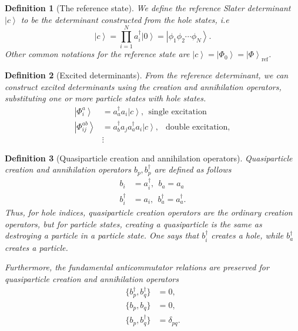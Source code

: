 \documentclass[a4paper,10pt]{article}
\newcommand{\ket}[1]{\left| #1 \right\rangle} \newcommand{\element}[3]
\theoremstyle{definition}
\newtheorem{definition}{Definition}
\begin{document}
\begin{definition}[The reference state]
 We define the reference Slater determinant $\ket{c}$ to be the determinant constructed from the hole states, i.e 
 \begin{equation}
  \ket{c} = \prod_{i=1}^N a_i^\dagger \ket{0} = \ket{\phi_1 \phi_2 \cdots \phi_N}.
 \end{equation}
Other common notations for the reference state are $\ket{c} = \ket{\Phi_0} = \ket{\Phi}_\text{ref}$.
\end{definition}

\begin{definition}[Excited determinants]
 From the reference determinant, we can construct excited determinants using the creation and annihilation operators,
 substituting one or more particle states with hole states.
 \begin{align*}
  \ket{\Phi_i^a} &= a_a^\dagger a_i \ket{c}, \ \ \text{single excitation} \\
  \ket{\Phi_{ij}^{ab}} &= a_b^\dagger a_j a_a^\dagger a_i \ket{c}, \ \ \text{ double excitation}, \\
  &\vdots
 \end{align*}
\end{definition}

\begin{definition}[Quasiparticle creation and annihilation operators]
 Quasiparticle creation and annihilation operators $b_p,b_p^\dagger$ are defined as follows
 \begin{align}
  b_i &= a_i^\dagger, \ \ b_a = a_a \\
  b_i^\dagger &= a_i, \ \ b_a^\dagger = a_a^\dagger.
 \end{align}
 Thus, for hole indices, quasiparticle creation operators are the ordinary creation operators, but for
particle states, creating a quasiparticle is the same as destroying a particle in a particle state. One says
that $b_i^\dagger$ creates a hole, while $b_a^\dagger$ creates a particle.

Furthermore, the fundamental anticommutator relations are preserved for quasiparticle creation and annihilation operators
\begin{align}
 \{b_p^\dagger,b_q^\dagger \} &= 0, \\
 \{b_p,b_q \} &= 0, \\
 \{b_p,b_q^\dagger \} &= \delta_{pq}.
\end{align}
\end{definition}
\end{document}
